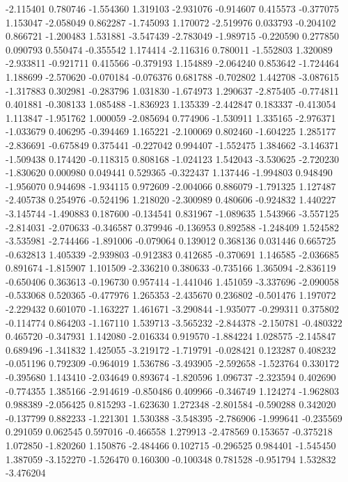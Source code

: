 -2.115401
0.780746
-1.554360
1.319103
-2.931076
-0.914607
0.415573
-0.377075
1.153047
-2.058049
0.862287
-1.745093
1.170072
-2.519976
0.033793
-0.204102
0.866721
-1.200483
1.531881
-3.547439
-2.783049
-1.989715
-0.220590
0.277850
0.090793
0.550474
-0.355542
1.174414
-2.116316
0.780011
-1.552803
1.320089
-2.933811
-0.921711
0.415566
-0.379193
1.154889
-2.064240
0.853642
-1.724464
1.188699
-2.570620
-0.070184
-0.076376
0.681788
-0.702802
1.442708
-3.087615
-1.317883
0.302981
-0.283796
1.031830
-1.674973
1.290637
-2.875405
-0.774811
0.401881
-0.308133
1.085488
-1.836923
1.135339
-2.442847
0.183337
-0.413054
1.113847
-1.951762
1.000059
-2.085694
0.774906
-1.530911
1.335165
-2.976371
-1.033679
0.406295
-0.394469
1.165221
-2.100069
0.802460
-1.604225
1.285177
-2.836691
-0.675849
0.375441
-0.227042
0.994407
-1.552475
1.384662
-3.146371
-1.509438
0.174420
-0.118315
0.808168
-1.024123
1.542043
-3.530625
-2.720230
-1.830620
0.000980
0.049441
0.529365
-0.322437
1.137446
-1.994803
0.948490
-1.956070
0.944698
-1.934115
0.972609
-2.004066
0.886079
-1.791325
1.127487
-2.405738
0.254976
-0.524196
1.218020
-2.300989
0.480606
-0.924832
1.440227
-3.145744
-1.490883
0.187600
-0.134541
0.831967
-1.089635
1.543966
-3.557125
-2.814031
-2.070633
-0.346587
0.379946
-0.136953
0.892588
-1.248409
1.524582
-3.535981
-2.744466
-1.891006
-0.079064
0.139012
0.368136
0.031446
0.665725
-0.632813
1.405339
-2.939803
-0.912383
0.412685
-0.370691
1.146585
-2.036685
0.891674
-1.815907
1.101509
-2.336210
0.380633
-0.735166
1.365094
-2.836119
-0.650406
0.363613
-0.196730
0.957414
-1.441046
1.451059
-3.337696
-2.090058
-0.533068
0.520365
-0.477976
1.265353
-2.435670
0.236802
-0.501476
1.197072
-2.229432
0.601070
-1.163227
1.461671
-3.290844
-1.935077
-0.299311
0.375802
-0.114774
0.864203
-1.167110
1.539713
-3.565232
-2.844378
-2.150781
-0.480322
0.465720
-0.347931
1.142080
-2.016334
0.919570
-1.884224
1.028575
-2.145847
0.689496
-1.341832
1.425055
-3.219172
-1.719791
-0.028421
0.123287
0.408232
-0.051196
0.792309
-0.964019
1.536786
-3.493905
-2.592658
-1.523764
0.330172
-0.395680
1.143410
-2.034649
0.893674
-1.820596
1.096737
-2.323594
0.402690
-0.774355
1.385166
-2.914619
-0.850486
0.409966
-0.346749
1.124274
-1.962803
0.988389
-2.056425
0.815293
-1.623630
1.272348
-2.801584
-0.590288
0.342020
-0.137799
0.882233
-1.221301
1.530388
-3.548395
-2.786906
-1.999641
-0.235569
0.291059
0.062545
0.597016
-0.466558
1.279913
-2.478569
0.153657
-0.375218
1.072850
-1.820260
1.150876
-2.484466
0.102715
-0.296525
0.984401
-1.545450
1.387059
-3.152270
-1.526470
0.160300
-0.100348
0.781528
-0.951794
1.532832
-3.476204
